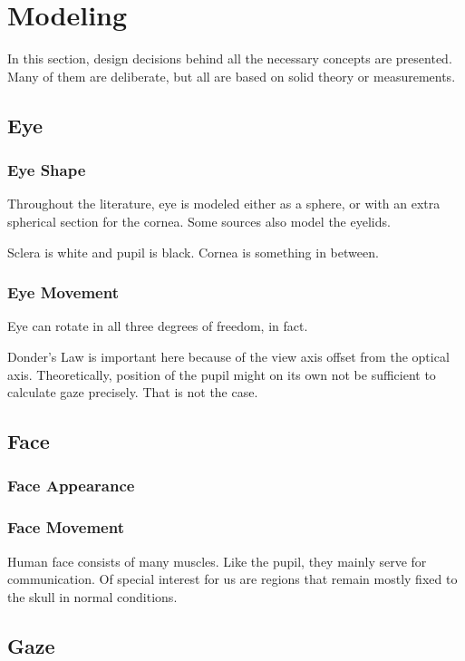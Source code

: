 \chapter{Modeling}

In this section, design decisions behind all the necessary concepts are presented.
Many of them are deliberate, but all are based on solid theory or measurements.

\section{Eye}
\subsection{Eye Shape}

Throughout the literature, eye is modeled either as a sphere, or with an extra spherical section for the cornea.
Some sources also model the eyelids.

Sclera is white and pupil is black.
Cornea is something in between.

\subsection{Eye Movement}

Eye can rotate in all three degrees of freedom, in fact.

Donder's Law is important here because of the view axis offset from the optical axis.
Theoretically, position of the pupil might on its own not be sufficient to calculate gaze precisely.
That is not the case.

\section{Face}
\subsection{Face Appearance}
\subsection{Face Movement}
Human face consists of many muscles.
Like the pupil, they mainly serve for communication.
Of special interest for us are regions that remain mostly fixed to the skull in normal conditions.

\section{Gaze}


